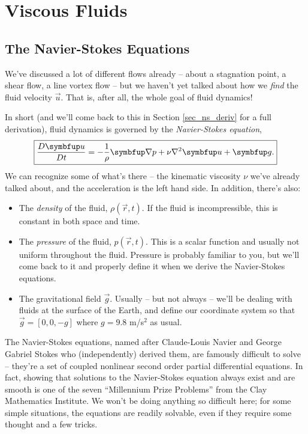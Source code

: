 \chapter{Viscous Fluids}

%
% 

\section{The Navier-Stokes Equations}

We've discussed a lot of different flows already -- about a stagnation point, a shear flow, a line vortex flow -- but we haven't yet talked about how we \emph{find} the fluid velocity $\vec{u}$.  That is, after all, the whole goal of fluid dynamics!

In short (and we'll come back to this in Section \ref{sec_ns_deriv} for a full derivation), fluid dynamics is governed by the \emph{Navier-Stokes equation},
\begin{equation}
\boxed{
\frac{D \vec{u}}{Dt} = -\frac{1}{\rho} \grad p + \nu \nabla^2 \vec{u} +  \vec{g}.
}
\end{equation}
We can recognize some of what's there -- the kinematic viscosity $\nu$ we've already talked about, and the acceleration is the left hand side.  In addition, there's also:
\begin{itemize}
\item The \emph{density} of the fluid, $\rho(\vec{r}, t)$.  If the fluid is incompressible, this is constant in both space and time.
\item The \emph{pressure} of the fluid, $p(\vec{r}, t)$.  This is a scalar function and usually not uniform throughout the fluid.  Pressure is probably familiar to you, but we'll come back to it and properly define it when we derive the Navier-Stokes equations.
\item The gravitational field $\vec{g}$.  Usually -- but not always -- we'll be dealing with fluids at the surface of the Earth, and define our coordinate system so that $\vec{g} = [0,0,-g]$ where $g = 9.8$ m/s$^2$ as usual. 
\end{itemize}

The Navier-Stokes equations, named after Claude-Louis Navier and George Gabriel Stokes who (independently) derived them, are famously difficult to solve -- they're a set of coupled nonlinear second order partial differential equations.  In fact, showing that solutions to the Navier-Stokes equation always exist and are smooth is one of the seven ``Millennium Prize Problems'' from the Clay Mathematics Institute.  We won't be doing anything so difficult here; for some simple situations, the equations are readily solvable, even if they require some thought and a few tricks.

